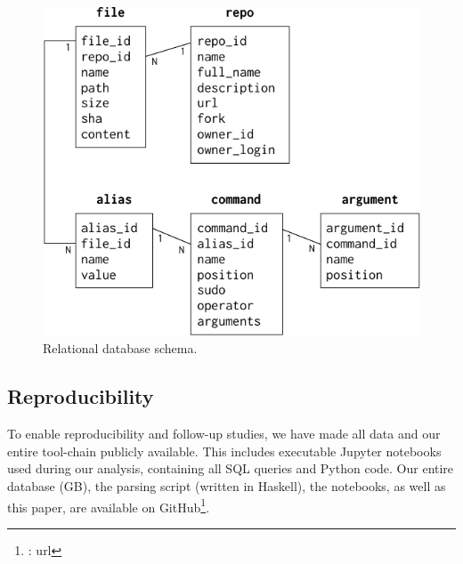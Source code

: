 \begin{figure}
    \centering
    \includegraphics[width=0.9\columnwidth]{schema.pdf}
    \caption{Relational database schema.}
    \label{fig:schema}
\end{figure}

\subsection{Reproducibility}

To enable reproducibility and follow-up studies, we have made all data and our entire tool-chain publicly available.
This includes executable Jupyter notebooks used during our analysis, containing all SQL queries and Python code.
Our entire database (\TODO GB), the parsing script (written in Haskell), the notebooks, as well as this paper, are available on GitHub\footnote{\TODO: url}.


